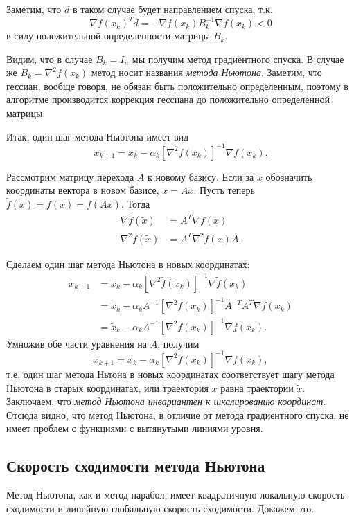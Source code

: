 \documentclass[a4paper, 12pt]{article}
\begin{document}
Заметим, что $d$ в таком случае будет направлением спуска, т.к. $$\nabla f(x_k)^Td = -\nabla f(x_k) B_k^{-1}\nabla f(x_k) < 0$$ в силу положительной определенности матрицы $B_k$.

Видим, что в случае $B_k = I_n$ мы получим метод градиентного спуска. В случае же $B_k = \nabla^2 f(x_k)$ метод носит названия \textit{метода Ньютона}. Заметим, что гессиан, вообще говоря, не обязан быть положительно определенным, поэтому в алгоритме производится коррекция гессиана до положительно определенной матрицы.

Итак, один шаг метода Ньютона имеет вид
$$x_{k+1} = x_k - \alpha_k \left[\nabla^2 f(x_k)\right]^{-1} \nabla f(x_k).$$

Рассмотрим матрицу перехода $A$ к новому базису. Если за $\tilde{x}$ обозначить координаты вектора в новом базисе, $x = A\tilde{x}$. Пусть теперь $\tilde{f}(\tilde{x}) = f(x) = f(A\tilde{x})$. Тогда
\begin{align}
    \nabla \tilde{f}(\tilde{x}) &= A^T \nabla f(x) \\
    \nabla^2 \tilde{f}(\tilde{x}) &= A^T \nabla^2 f(x) A.
\end{align}

Сделаем один шаг метода Ньютона в новых координатах:
\begin{align}
    \tilde{x}_{k+1} &= \tilde{x}_k - \alpha_k \left[\nabla^2 \tilde{f}(\tilde{x}_k)\right]^{-1} \nabla \tilde{f}(\tilde{x}_k) \\  &= \tilde{x}_k - \alpha_k A^{-1}\left[\nabla^2 f(x_k)\right]^{-1} A^{-T}A^T \nabla f(x_k) \\ &= \tilde{x}_k - \alpha_k A^{-1}\left[\nabla^2 f(x_k)\right]^{-1}\nabla f(x_k).
\end{align}
Умножив обе части уравнения на $A$, получим
$$x_{k+1} = x_k - \alpha_k \left[\nabla^2 f(x_k)\right]^{-1} \nabla f(x_k),$$
т.е. один шаг метода Ньтона в новых координатах соответствует шагу метода Ньютона в старых координатах, или траектория $x$ равна траектории $\tilde{x}$. Заключаем, что \textit{метод Ньютона инвариантен к шкалированию координат}. Отсюда видно, что метод Ньютона, в отличие от метода градиентного спуска, не имеет проблем с функциями с вытянутыми линиями уровня. %

\subsection{Скорость сходимости метода Ньютона}
Метод Ньютона, как и метод парабол, имеет квадратичную локальную скорость сходимости и линейную глобальную скорость сходимости. Докажем это.
\end{document}
